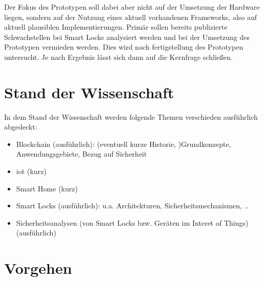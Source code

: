     Der Fokus des Prototypen soll dabei aber nicht auf der Umsetzung der Hardware liegen, sondern auf der Nutzung eines aktuell vorhandenen Frameworks, also auf aktuell plausiblen Implementierungen. 
    Primär sollen bereits publizierte Schwachstellen bei Smart Locks analysiert werden und bei der Umsetzung des Prototypen vermieden werden. 
    Dies wird nach fertigstellung des Prototypen untersucht.
    Je nach Ergebnis lässt sich dann auf die Kernfrage schließen.

\section*{Stand der Wissenschaft}
    In dem Stand der Wissenschaft werden folgende Themen verschieden ausführlich abgedeckt:
    \begin{itemize}
        \item Blockchain (ausführlich): (eventuell kurze Historie, )Grundkonzepte, Anwendungsgebiete, Bezug auf Sicherheit
        \item \gls{iot} (kurz)
        \item Smart Home (kurz)
        \item Smart Locks (ausführlich): u.a. Architekturen, Sicherheitsmechanismen, ..
        \item Sicherheitsanalysen (von Smart Locks bzw. Geräten im Interet of Things) (ausführlich)
    \end{itemize}

\section*{Vorgehen}
